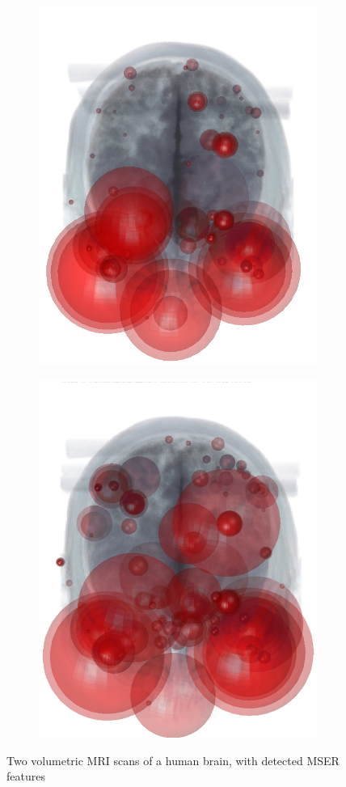 \begin{figure}[ht]
	\centering 
	\begin{subfigure}[t]{0.35\linewidth} \centering 
		\includegraphics[width=0.8\linewidth]{./fig/eval/mri.png}
		\label{fig/eval/mri1}
	\end{subfigure}
	\begin{subfigure}[t]{0.35\linewidth} \centering 
		\includegraphics[width=0.8\linewidth]{./fig/eval/mri2.png}
		\label{fig/eval/mri2}
	\end{subfigure}
	\caption{Two volumetric MRI scans of a human brain, with detected MSER features}
	\label{fig/eval/mri}
\end{figure}


